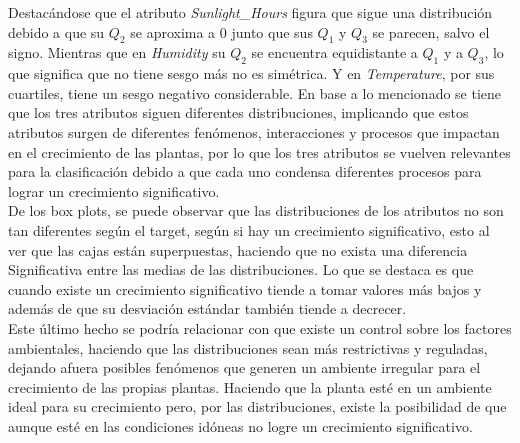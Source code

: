 \documentclass[12pt,a4paper]{article}
\begin{document}
{{            Destacándose que el atributo \emph{Sunlight\_Hours} figura que sigue una 
            distribución debido a que su $Q_2$ se aproxima a $0$ junto que sus $Q_1$ 
            y $Q_3$ se parecen, salvo el signo. Mientras que en \emph{Humidity} su $Q_2$ 
            se encuentra equidistante a $Q_1$ y a $Q_3$, lo que significa que no tiene 
            sesgo más no es simétrica. Y en \emph{Temperature}, por sus cuartiles, tiene 
            un sesgo negativo considerable. En base a lo mencionado se tiene que los tres 
            atributos siguen diferentes distribuciones, implicando que estos atributos surgen 
            de diferentes fenómenos, interacciones y procesos que impactan en el crecimiento 
            de las plantas, por lo que los tres atributos se vuelven relevantes para la 
            clasificación debido a que cada uno condensa diferentes procesos para lograr un 
            crecimiento significativo.\\

            De los box plots, se puede observar que las distribuciones de los atributos 
            no son tan diferentes según el target, según si hay un crecimiento significativo, 
            esto al ver que las cajas están superpuestas, haciendo que no exista una diferencia 
            Significativa entre las medias de las distribuciones. Lo que se destaca es que 
            cuando existe un crecimiento significativo tiende a tomar valores más bajos y además 
            de que su desviación estándar también tiende a decrecer.\\ 

            Este último hecho se podría relacionar con que existe un control sobre los factores 
            ambientales, haciendo que las distribuciones sean más restrictivas y reguladas, 
            dejando afuera posibles fenómenos que generen un ambiente irregular para el 
            crecimiento de las propias plantas. Haciendo que la planta esté en un ambiente ideal 
            para su crecimiento pero, por las distribuciones, existe la posibilidad de que aunque 
            esté en las condiciones idóneas no logre un crecimiento significativo.

}}
\end{document}
